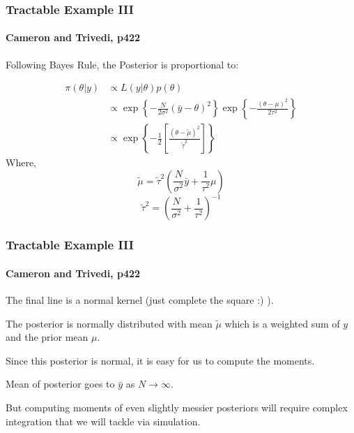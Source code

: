 \documentclass[11pt, aspectratio=169]{beamer}
\newenvironment{wideitemize}{\itemize\addtolength{\itemsep}{10pt}}{\enditemize}
\begin{document}
\begin{frame}[t]\frametitle{Tractable Example III}
\framesubtitle{Cameron and Trivedi, p422}    

Following Bayes Rule, the Posterior is proportional to:

\begin{align*}
\pi(\theta | y) & \propto L(y|\theta) p(\theta) \\
& \propto \exp  \left\{ - \frac{N}{2 \sigma^2}   (\bar{y} - \theta)^2 \right\} \exp \left\{ - \frac{(\theta - \mu)^2}{2 \tau^2} \right\} \\
& \propto  \exp \left\{ - \frac{1}{2} \left[ \frac{ (\theta - \tilde{\mu})^2 }{\tilde{\tau}^2} \right] \right\}
\end{align*} 
Where,  
$$\tilde{\mu} = \tilde{\tau}^2 \left( \frac{N}{\sigma^2} \bar{y} + \frac{1}{\tau^2} \mu \right)$$
$$\tilde{\tau}^2 = \left(  \frac{N}{\sigma^2} + \frac{1}{\tau^2} \right)^{-1} $$


\end{frame}


\begin{frame}[c]\frametitle{Tractable Example III}
\framesubtitle{Cameron and Trivedi, p422}    

\begin{wideitemize}
	\item The final line is a normal kernel (just complete the square :) ). 
	\item The posterior is normally distributed with mean $\tilde{\mu}$ which is a weighted sum of $y$ and the prior mean $\mu$.
	\item Since this posterior is normal, it is easy for us to compute the moments.
	\item Mean of posterior goes to $\bar{y}$ as $N\rightarrow\infty$. 
	\item But computing moments of even slightly messier posteriors will require complex integration that we will tackle via simulation. 
\end{wideitemize}


\end{frame}
\end{document}
